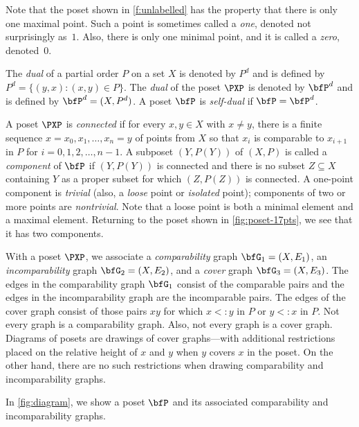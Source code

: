 Note that the poset shown in \autoref{f:unlabelled} has the property
that there is only one maximal point.  Such a point is sometimes
called a \textit{one}, denoted not surprisingly as~$1$.  Also, there
is only one minimal point, and it is called a \textit{zero},
denoted~$0$.

The \textit{dual} of a partial order $P$ on a set $X$ is denoted by
$P^d$ and is defined by $P^d=\{(y,x):(x,y)\in P\}$. The \textit{dual}
of the poset $\PXP$ is denoted by $\bfP^d$ and is defined by
$\bfP^d=(X,P^d)$. A poset $\bfP$ is \textit{self-dual} if
$\bfP=\bfP^d$.

A poset $\PXP$ is \textit{connected} if for every $x,y\in X$ with
$x\ne y$, there is a finite sequence $x=x_0,x_1,\dots,x_n=y$ of points
from $X$ so that $x_i$ is comparable to $x_{i+1}$ in $P$ for
$i=0,1,2,\dots,n-1$. A subposet $(Y,P(Y))$ of $(X,P)$ is called a
\textit{component} of $\bfP$ if $(Y,P(Y))$ is connected and there is
no subset $Z\subseteq X$ containing $Y$ as a proper subset for which
$(Z,P(Z))$ is connected.  A one-point component is \textit{trivial}
(also, a \textit{loose} point or \textit{isolated} point); components
of two or more points are \textit{nontrivial}.  Note that a loose
point is both a minimal element and a maximal element.  Returning to
the poset shown in \autoref{fig:poset-17pts}, we see that it has two
components.

With a poset $\PXP$, we associate a \textit{comparability} graph
${\bfG}_1=(X,E_1)$, an \textit{incomparability} graph
${\bfG}_2=(X,E_2)$, and a \textit{cover }graph ${\bfG}_3=(X,E_3)$. The
edges in the comparability graph ${\bfG}_1$ consist of the comparable
pairs and the edges in the incomparability graph are the incomparable
pairs. The edges of the cover graph consist of those pairs $xy$ for
which $x<:y$ in $P$ or $y<:x$ in $P$.  Not every graph is a
comparability graph.  Also, not every graph is a cover graph.
Diagrams of posets are drawings of cover graphs---with additional
restrictions placed on the relative height of $x$ and $y$ when
$y$ covers $x$ in the poset.  On the other hand, there are no such
restrictions when drawing comparability and incomparability graphs.

In \autoref{fig:diagram}, we show a poset $\bfP$ and its associated
comparability and incomparability graphs.


